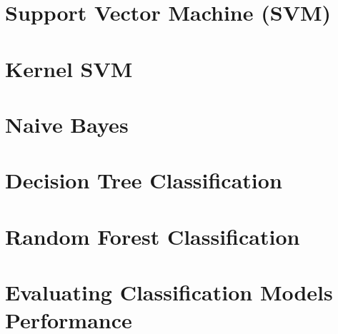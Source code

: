 \section{Support Vector Machine (SVM)}

\section{Kernel SVM}

\section{Naive Bayes}

\section{Decision Tree Classification}

\section{Random Forest Classification}

\section{Evaluating Classification Models Performance}